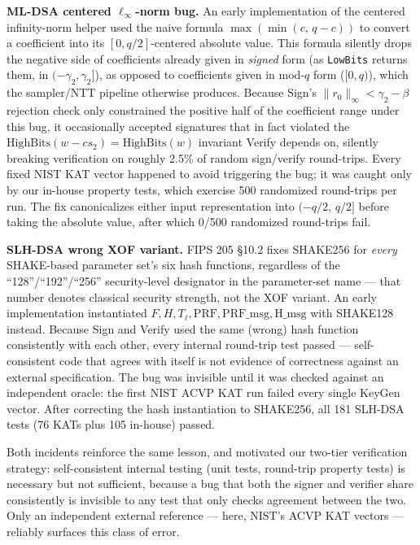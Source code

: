 \documentclass[10pt,conference]{IEEEtran}
\begin{document}
\textbf{ML-DSA centered $\ell_\infty$-norm bug.} An early implementation
of the centered infinity-norm helper used the naive formula
$\max(\min(c,\, q-c))$ to convert a coefficient into its
$[0, q/2]$-centered absolute value. This formula silently drops the
negative side of coefficients already given in \emph{signed} form (as
\texttt{LowBits} returns them, in $(-\gamma_2, \gamma_2]$), as opposed to
coefficients given in mod-$q$ form ($[0, q)$), which the sampler/NTT
pipeline otherwise produces. Because Sign's $\|r_0\|_\infty < \gamma_2 -
\beta$ rejection check only constrained the positive half of the
coefficient range under this bug, it occasionally accepted signatures
that in fact violated the
$\mathrm{HighBits}(w - c s_2) = \mathrm{HighBits}(w)$ invariant Verify
depends on, silently breaking verification on roughly 2.5\% of random
sign/verify round-trips. Every fixed NIST KAT vector happened to avoid
triggering the bug; it was caught only by our in-house property tests,
which exercise 500 randomized round-trips per run. The fix canonicalizes
either input representation into $(-q/2,\, q/2]$ before taking the
absolute value, after which 0/500 randomized round-trips fail.

\textbf{SLH-DSA wrong XOF variant.} FIPS 205 \S10.2 fixes SHAKE256 for
\emph{every} SHAKE-based parameter set's six hash functions, regardless
of the ``128''/``192''/``256'' security-level designator in the
parameter-set name --- that number denotes classical security strength,
not the XOF variant. An early implementation instantiated
$F, H, T_\ell, \mathrm{PRF}, \mathrm{PRF\_msg}, \mathrm{H\_msg}$ with
SHAKE128 instead. Because Sign and Verify used the same (wrong) hash
function consistently with each other, every internal round-trip test
passed --- self-consistent code that agrees with itself is not evidence
of correctness against an external specification. The bug was invisible
until it was checked against an independent oracle: the first NIST ACVP
KAT run failed every single KeyGen vector. After correcting the hash
instantiation to SHAKE256, all 181 SLH-DSA tests (76 KATs plus 105
in-house) passed.

Both incidents reinforce the same lesson, and motivated our two-tier
verification strategy: self-consistent internal testing (unit tests,
round-trip property tests) is necessary but not sufficient, because a
bug that both the signer and verifier share consistently is invisible to
any test that only checks agreement between the two. Only an independent
external reference --- here, NIST's ACVP KAT vectors --- reliably
surfaces this class of error.
\end{document}
